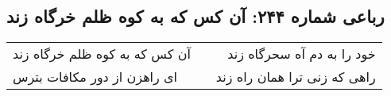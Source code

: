 \begin{center}
\section*{رباعی شماره ۲۴۴: آن کس که به کوه ظلم خرگاه زند}
\label{sec:sh244}
\begin{longtable}{l p{0.5cm} r}
آن کس که به کوه ظلم خرگاه زند
&&
خود را به دم آه سحرگاه زند
\\
ای راهزن از دور مکافات بترس
&&
راهی که زنی ترا همان راه زند
\\
\end{longtable}
\end{center}
